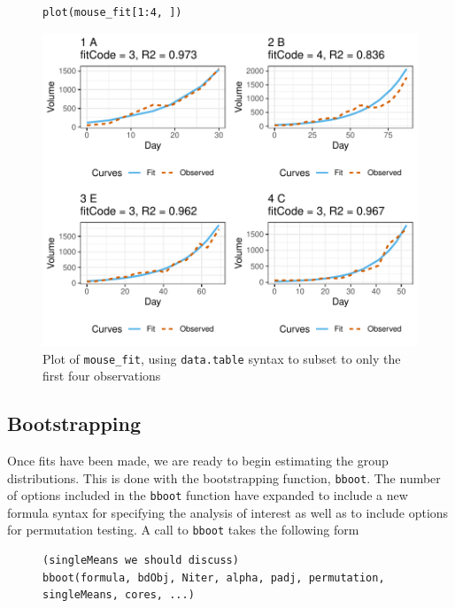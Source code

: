 \documentclass{article}
\newcommand{\xt}{\texttt}%
\begin{document}
\begin{singlespace}
\begin{figure}[H]
\centering
\begin{BVerbatim}
plot(mouse_fit[1:4, ])
\end{BVerbatim}
\end{figure}
\end{singlespace}

\begin{figure}[H]
\centering
\includegraphics[width=\textwidth]{img/mouse_fit.pdf}
\caption{Plot of \xt{mouse\_fit}, using \xt{data.table} syntax to subset to only the first four observations}
\label{fig:plot_fits}
\end{figure}

\subsection{Bootstrapping}

Once fits have been made, we are ready to begin estimating the group distributions. This is done with the bootstrapping function, \xt{bboot}. The number of options included in the \xt{bboot} function have expanded to include a new formula syntax for specifying the analysis of interest as well as to include options for permutation testing. A call to \xt{bboot} takes the following form

\begin{singlespace}
\begin{figure}[H]
\centering
\begin{BVerbatim}
(singleMeans we should discuss)
bboot(formula, bdObj, Niter, alpha, padj, permutation, singleMeans, cores, ...)
\end{BVerbatim}
\end{figure}
\end{singlespace}
\end{document}
